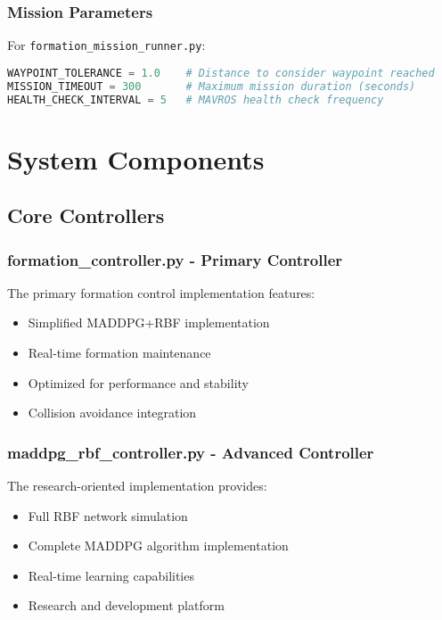 \documentclass[11pt,a4paper]{article}
\begin{document}
\subsubsection{Mission Parameters}

For \texttt{formation\_mission\_runner.py}:

\begin{lstlisting}[language=python, caption=Mission Configuration]
WAYPOINT_TOLERANCE = 1.0    # Distance to consider waypoint reached
MISSION_TIMEOUT = 300       # Maximum mission duration (seconds)
HEALTH_CHECK_INTERVAL = 5   # MAVROS health check frequency
\end{lstlisting}

\section{System Components}

\subsection{Core Controllers}

\subsubsection{formation\_controller.py - Primary Controller}

The primary formation control implementation features:
\begin{itemize}
    \item Simplified MADDPG+RBF implementation
    \item Real-time formation maintenance
    \item Optimized for performance and stability
    \item Collision avoidance integration
\end{itemize}

\subsubsection{maddpg\_rbf\_controller.py - Advanced Controller}

The research-oriented implementation provides:
\begin{itemize}
    \item Full RBF network simulation
    \item Complete MADDPG algorithm implementation
    \item Real-time learning capabilities
    \item Research and development platform
\end{itemize}
\end{document}

